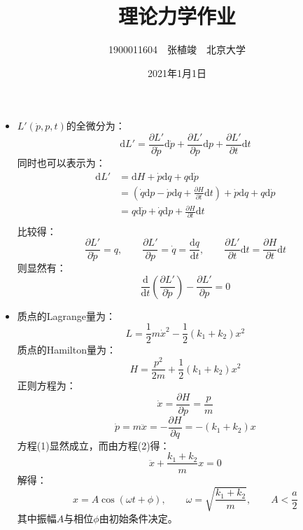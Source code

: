 \documentclass[a4paper,fontset=windows]{ctexart}
\begin{document}
    \title{\textbf{理论力学作业}}
    \author{1900011604\ \ 张植竣\ \ 北京大学}
    \date{2021年1月1日}

    \maketitle

    \begin{itemize}

        \section*{第六章}

        \item[6.1]
        $L'(\dot{p},p,t)$的全微分为：
        \[
        \mathrm{d}L' = \frac{\partial L'}{\partial \dot{p}}\mathrm{d}\dot{p} + \frac{\partial L'}{\partial p}\mathrm{d}p + \frac{\partial L'}{\partial t}\mathrm{d}t
        \]
        同时也可以表示为：
        \begin{align*}
            \mathrm{d}L'
            &= \mathrm{d}H + \dot{p}\mathrm{d}q + q\mathrm{d}\dot{p} \\
            &= \left(\dot{q}\mathrm{d}p - \dot{p}\mathrm{d}q + \frac{\partial H}{\partial t}\mathrm{d}t\right) + \dot{p}\mathrm{d}q + q\mathrm{d}\dot{p} \\
            &= q\mathrm{d}\dot{p} + \dot{q}\mathrm{d}p + \frac{\partial H}{\partial t}\mathrm{d}t \\
        \end{align*}
        比较得：
        \[
        \frac{\partial L'}{\partial \dot{p}} = q,\qquad \frac{\partial L'}{\partial p} = \dot{q} = \frac{\mathrm{d}q}{\mathrm{d}t},\qquad \frac{\partial L'}{\partial t}\mathrm{d}t = \frac{\partial H}{\partial t}\mathrm{d}t
        \]
        则显然有：
        \[
        \frac{\mathrm{d}}{\mathrm{d}t}\left(\frac{\partial L'}{\partial \dot{p}}\right) - \frac{\partial L'}{\partial p} = 0
        \]
        \bigskip

        \setcounter{equation}{0}
        \item[6.2]
        质点的Lagrange量为：
        \[
        L = \frac{1}{2}m\dot{x}^2 - \frac{1}{2}(k_1 + k_2)x^2
        \]
        质点的Hamilton量为：
        \[
        H = \frac{p^2}{2m} + \frac{1}{2}(k_1 + k_2)x^2
        \]
        正则方程为：
        \begin{equation}
            \dot{x} = \frac{\partial H}{\partial p} = \frac{p}{m}
        \end{equation}
        \begin{equation}
            \dot{p} = m\ddot{x} = -\frac{\partial H}{\partial q} = -(k_1 + k_2)x
        \end{equation}
        方程(1)显然成立，而由方程(2)得：
        \[
        \ddot{x} + \frac{k_1 + k_2}{m}x = 0
        \]
        解得：
        \[
        x = A\cos(\omega t + \phi),\qquad \omega = \sqrt{\frac{k_1 + k_2}{m}},\qquad A < \frac{a}{2}
        \]
        其中振幅$A$与相位$\phi$由初始条件决定。
        \bigskip


\end{itemize}
\end{document}
